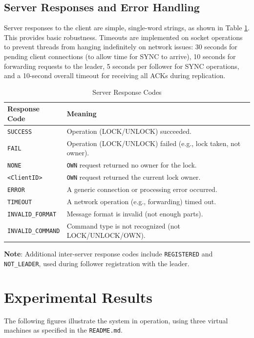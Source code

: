 \documentclass[a4paper,11pt]{article}
\begin{document}
\subsection*{Server Responses and Error Handling}
Server responses to the client are simple, single-word strings, as shown in Table \ref{tab:responses}. This provides basic robustness. Timeouts are implemented on socket operations to prevent threads from hanging indefinitely on network issues: 30 seconds for pending client connections (to allow time for SYNC to arrive), 10 seconds for forwarding requests to the leader, 5 seconds per follower for SYNC operations, and a 10-second overall timeout for receiving all ACKs during replication.

\begin{table}[htbp]
\centering
\caption{Server Response Codes}
\label{tab:responses}
\begin{tabular}{@{}ll@{}}
\toprule
\textbf{Response Code} & \textbf{Meaning} \\
\midrule
\texttt{SUCCESS} & Operation (LOCK/UNLOCK) succeeded. \\
\texttt{FAIL} & Operation (LOCK/UNLOCK) failed (e.g., lock taken, not owner). \\
\texttt{NONE} & \texttt{OWN} request returned no owner for the lock. \\
\texttt{<ClientID>} & \texttt{OWN} request returned the current lock owner. \\
\texttt{ERROR} & A generic connection or processing error occurred. \\
\texttt{TIMEOUT} & A network operation (e.g., forwarding) timed out. \\
\texttt{INVALID\_FORMAT} & Message format is invalid (not enough parts). \\
\texttt{INVALID\_COMMAND} & Command type is not recognized (not LOCK/UNLOCK/OWN). \\
\bottomrule
\end{tabular}
\end{table}

\textbf{Note}: Additional inter-server response codes include \texttt{REGISTERED} and \texttt{NOT\_LEADER}, used during follower registration with the leader.

\section{Experimental Results}
The following figures illustrate the system in operation, using three virtual machines as specified in the \texttt{README.md}.
\end{document}
